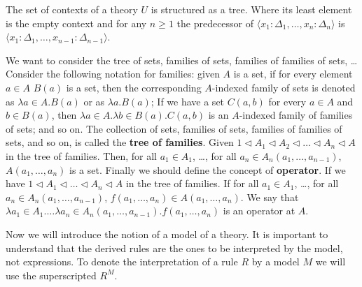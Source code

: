 The set of contexts of a theory $U$ is structured as a tree.
Where its least element is the empty context and for any $n \geq 1$
the predecessor of $\langle x_1 : \Delta_1, \dots, x_n : \Delta_n \rangle$
is $\langle x_1 : \Delta_1, \dots, x_{n-1} : \Delta_{n-1} \rangle$.

We want to consider the tree of sets, families of sets, families of families of sets, \dots
Consider the following notation for families:
given $A$ is a set, if for every element $a \in A$ $B(a)$ is a set,
then the corresponding $A$-indexed family of sets is denoted as
$\lambda a \in A . B(a)$ or as $\lambda a . B(a)$;
If we have a set $C(a, b)$ for every $a \in A$ and $b \in B(a)$,
then $\lambda a \in A. \lambda b \in B(a). C(a, b)$
is an $A$-indexed family of families of sets; and so on.
The collection of sets, families of sets, families of families of sets, and so on,
is called the \textbf{tree of families}.
Given $1 \vartriangleleft A_1 \vartriangleleft A_2 \vartriangleleft \dots \vartriangleleft A_n \vartriangleleft A$
in the tree of families. Then, for all $a_1 \in A_1$, \dots,
for all $a_n \in A_n(a_1, \dots, a_{n-1})$, $A(a_1, \dots, a_n)$ is a set.
Finally we should define the concept of \textbf{operator}.
If we have $1 \vartriangleleft A_1 \vartriangleleft \dots \vartriangleleft A_n \vartriangleleft A$
in the tree of families. If for all $a_1 \in A_1$, \dots, 
for all $a_n \in A_n(a_1, \dots, a_{n-1})$,
$f(a_1, \dots, a_n) \in A(a_1, \dots, a_n)$. 
We say that $\lambda a_1 \in A_1. \dots \lambda a_n \in A_n(a_1, \dots, a_{n-1}). f(a_1, \dots, a_n)$
is an operator at $A$.

Now we will introduce the notion of a model of a theory.
It is important to understand that the derived rules are the ones
to be interpreted by the model, not expressions. 
To denote the interpretation of a rule $R$ by a model $M$
we will use the superscripted $R^M$.

